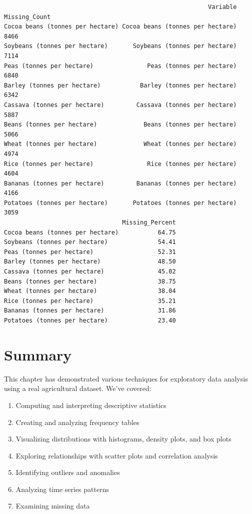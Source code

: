 \documentclass[
  letterpaper,
]{book}
\providecommand{\tightlist}{%
  \setlength{\itemsep}{0pt}\setlength{\parskip}{0pt}}
\begin{document}
\begin{verbatim}
                                                         Variable Missing_Count
Cocoa beans (tonnes per hectare) Cocoa beans (tonnes per hectare)          8466
Soybeans (tonnes per hectare)       Soybeans (tonnes per hectare)          7114
Peas (tonnes per hectare)               Peas (tonnes per hectare)          6840
Barley (tonnes per hectare)           Barley (tonnes per hectare)          6342
Cassava (tonnes per hectare)         Cassava (tonnes per hectare)          5887
Beans (tonnes per hectare)             Beans (tonnes per hectare)          5066
Wheat (tonnes per hectare)             Wheat (tonnes per hectare)          4974
Rice (tonnes per hectare)               Rice (tonnes per hectare)          4604
Bananas (tonnes per hectare)         Bananas (tonnes per hectare)          4166
Potatoes (tonnes per hectare)       Potatoes (tonnes per hectare)          3059
                                 Missing_Percent
Cocoa beans (tonnes per hectare)           64.75
Soybeans (tonnes per hectare)              54.41
Peas (tonnes per hectare)                  52.31
Barley (tonnes per hectare)                48.50
Cassava (tonnes per hectare)               45.02
Beans (tonnes per hectare)                 38.75
Wheat (tonnes per hectare)                 38.04
Rice (tonnes per hectare)                  35.21
Bananas (tonnes per hectare)               31.86
Potatoes (tonnes per hectare)              23.40
\end{verbatim}

\section{Summary}\label{summary-2}

This chapter has demonstrated various techniques for exploratory data
analysis using a real agricultural dataset. We've covered:

\begin{enumerate}
\def\labelenumi{\arabic{enumi}.}
\tightlist
\item
  Computing and interpreting descriptive statistics
\item
  Creating and analyzing frequency tables
\item
  Visualizing distributions with histograms, density plots, and box
  plots
\item
  Exploring relationships with scatter plots and correlation analysis
\item
  Identifying outliers and anomalies
\item
  Analyzing time series patterns
\item
  Examining missing data
\end{enumerate}
\end{document}
